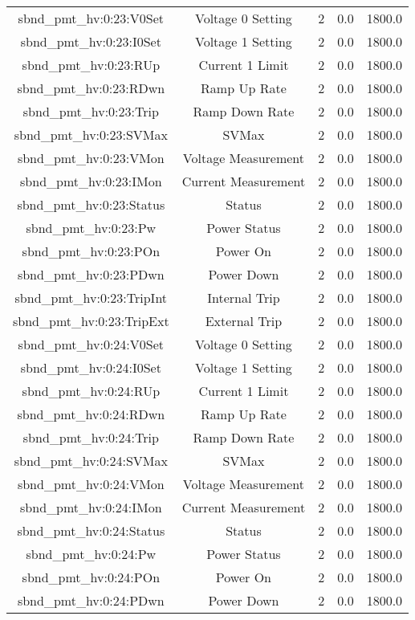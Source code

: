 \begin{center}
\begin{longtable}{c | c c c c }
sbnd\_pmt\_hv:0:23:V0Set & Voltage 0 Setting & 2 & 0.0 & 1800.0\\ 
sbnd\_pmt\_hv:0:23:I0Set & Voltage 1 Setting & 2 & 0.0 & 1800.0\\ 
sbnd\_pmt\_hv:0:23:RUp & Current 1 Limit & 2 & 0.0 & 1800.0\\ 
sbnd\_pmt\_hv:0:23:RDwn & Ramp Up Rate & 2 & 0.0 & 1800.0\\ 
sbnd\_pmt\_hv:0:23:Trip & Ramp Down Rate & 2 & 0.0 & 1800.0\\ 
sbnd\_pmt\_hv:0:23:SVMax & SVMax & 2 & 0.0 & 1800.0\\ 
sbnd\_pmt\_hv:0:23:VMon & Voltage Measurement & 2 & 0.0 & 1800.0\\ 
sbnd\_pmt\_hv:0:23:IMon & Current Measurement & 2 & 0.0 & 1800.0\\ 
sbnd\_pmt\_hv:0:23:Status & Status & 2 & 0.0 & 1800.0\\ 
sbnd\_pmt\_hv:0:23:Pw & Power Status & 2 & 0.0 & 1800.0\\ 
sbnd\_pmt\_hv:0:23:POn & Power On & 2 & 0.0 & 1800.0\\ 
sbnd\_pmt\_hv:0:23:PDwn & Power Down & 2 & 0.0 & 1800.0\\ 
sbnd\_pmt\_hv:0:23:TripInt & Internal Trip & 2 & 0.0 & 1800.0\\ 
sbnd\_pmt\_hv:0:23:TripExt & External Trip & 2 & 0.0 & 1800.0\\ 
sbnd\_pmt\_hv:0:24:V0Set & Voltage 0 Setting & 2 & 0.0 & 1800.0\\ 
sbnd\_pmt\_hv:0:24:I0Set & Voltage 1 Setting & 2 & 0.0 & 1800.0\\ 
sbnd\_pmt\_hv:0:24:RUp & Current 1 Limit & 2 & 0.0 & 1800.0\\ 
sbnd\_pmt\_hv:0:24:RDwn & Ramp Up Rate & 2 & 0.0 & 1800.0\\ 
sbnd\_pmt\_hv:0:24:Trip & Ramp Down Rate & 2 & 0.0 & 1800.0\\ 
sbnd\_pmt\_hv:0:24:SVMax & SVMax & 2 & 0.0 & 1800.0\\ 
sbnd\_pmt\_hv:0:24:VMon & Voltage Measurement & 2 & 0.0 & 1800.0\\ 
sbnd\_pmt\_hv:0:24:IMon & Current Measurement & 2 & 0.0 & 1800.0\\ 
sbnd\_pmt\_hv:0:24:Status & Status & 2 & 0.0 & 1800.0\\ 
sbnd\_pmt\_hv:0:24:Pw & Power Status & 2 & 0.0 & 1800.0\\ 
sbnd\_pmt\_hv:0:24:POn & Power On & 2 & 0.0 & 1800.0\\ 
sbnd\_pmt\_hv:0:24:PDwn & Power Down & 2 & 0.0 & 1800.0\\ 

\end{longtable}
\end{center}
